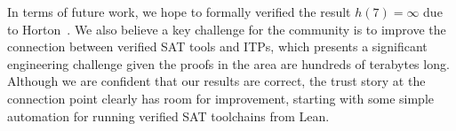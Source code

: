 In terms of future work, we hope to formally verified the result $h(7) = \infty$ due to Horton~\cite{hortonSetsNoEmpty1983}.
We also believe a key challenge for the community is to improve the connection between verified SAT tools and ITPs, which presents a significant engineering challenge given the proofs in the area are hundreds of terabytes long.
Although we are confident that our results are correct,
the trust story at the connection point  clearly has room for improvement,
starting with some simple automation for running verified SAT toolchains from Lean.
